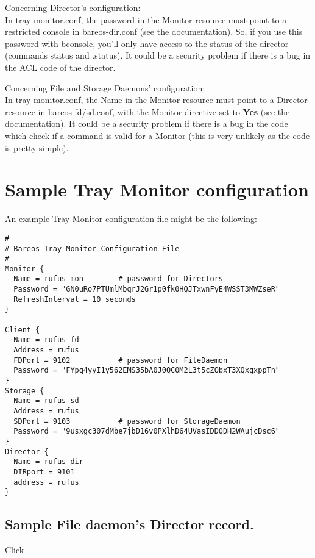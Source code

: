 Concerning Director's configuration: \\
In tray-monitor.conf, the password in the Monitor resource must point to
a restricted console in bareos-dir.conf (see the documentation). So, if
you use this password with bconsole, you'll only have access to the
status of the director (commands status and .status).
It could be a security problem if there is a bug in the ACL code of the
director.

Concerning File and Storage Daemons' configuration:\\
In tray-monitor.conf, the Name in the Monitor resource must point to a
Director resource in bareos-fd/sd.conf, with the Monitor directive set
to {\bf Yes} (see the documentation).
It could be a security problem if there is a bug in the code which check
if a command is valid for a Monitor (this is very unlikely as the code
is pretty simple).


\section{Sample Tray Monitor configuration}
\label{SampleConfiguration1}


An example Tray Monitor configuration file might be the following:

\footnotesize
\begin{verbatim}
#
# Bareos Tray Monitor Configuration File
#
Monitor {
  Name = rufus-mon        # password for Directors
  Password = "GN0uRo7PTUmlMbqrJ2Gr1p0fk0HQJTxwnFyE4WSST3MWZseR"
  RefreshInterval = 10 seconds
}

Client {
  Name = rufus-fd
  Address = rufus
  FDPort = 9102           # password for FileDaemon
  Password = "FYpq4yyI1y562EMS35bA0J0QC0M2L3t5cZObxT3XQxgxppTn"
}
Storage {
  Name = rufus-sd
  Address = rufus
  SDPort = 9103           # password for StorageDaemon
  Password = "9usxgc307dMbe7jbD16v0PXlhD64UVasIDD0DH2WAujcDsc6"
}
Director {
  Name = rufus-dir
  DIRport = 9101
  address = rufus
}
\end{verbatim}
\normalsize

\subsection{Sample File daemon's Director record.}

Click


